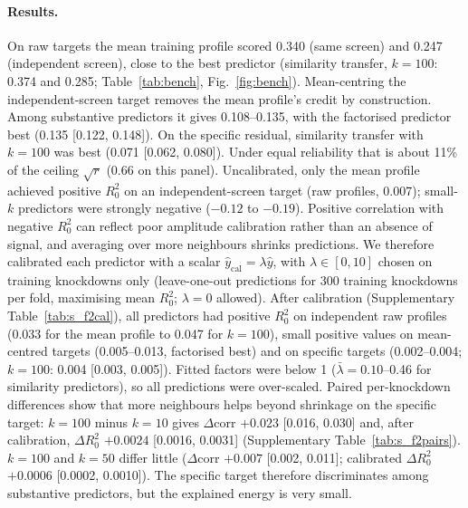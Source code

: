 \documentclass[10pt]{article}
\begin{document}
\paragraph{Results.} On raw targets the mean training profile scored 0.340 (same screen) and 0.247 (independent screen), close to the best predictor (similarity transfer, $k=100$: 0.374 and 0.285; Table~\ref{tab:bench}, Fig.~\ref{fig:bench}).
Mean-centring the independent-screen target removes the mean profile's credit by construction. Among substantive predictors it gives 0.108--0.135, with the factorised predictor best (0.135 [0.122, 0.148]).
On the specific residual, similarity transfer with $k=100$ was best (0.071 [0.062, 0.080]). Under equal reliability that is about 11\% of the ceiling $\sqrt{r}$ (0.66 on this panel).
Uncalibrated, only the mean profile achieved positive $R^2_0$ on an independent-screen target (raw profiles, 0.007); small-$k$ predictors were strongly negative ($-0.12$ to $-0.19$).
Positive correlation with negative $R^2_0$ can reflect poor amplitude calibration rather than an absence of signal, and averaging over more neighbours shrinks predictions. We therefore calibrated each predictor with a scalar $\hat y_\text{cal}=\lambda\hat y$, with $\lambda\in[0,10]$ chosen on training knockdowns only (leave-one-out predictions for 300 training knockdowns per fold, maximising mean $R^2_0$; $\lambda=0$ allowed).
After calibration (Supplementary Table~\ref{tab:s_f2cal}), all predictors had positive $R^2_0$ on independent raw profiles (0.033 for the mean profile to 0.047 for $k=100$), small positive values on mean-centred targets (0.005--0.013, factorised best) and on specific targets (0.002--0.004; $k=100$: 0.004 [0.003, 0.005]). Fitted factors were below 1 ($\bar\lambda=0.10$--0.46 for similarity predictors), so all predictions were over-scaled.
Paired per-knockdown differences show that more neighbours helps beyond shrinkage on the specific target: $k=100$ minus $k=10$ gives $\Delta$corr $+0.023$ [0.016, 0.030] and, after calibration, $\Delta R^2_0$ $+0.0024$ [0.0016, 0.0031] (Supplementary Table~\ref{tab:s_f2pairs}). $k=100$ and $k=50$ differ little ($\Delta$corr $+0.007$ [0.002, 0.011]; calibrated $\Delta R^2_0$ $+0.0006$ [0.0002, 0.0010]).
The specific target therefore discriminates among substantive predictors, but the explained energy is very small.

\begin{table}[t]
\centering\small
\caption{\textbf{Held-out knockdown prediction} (1{,}396 held-out knockdowns, 5 folds). Correlation with bootstrap 95\% CI; $R^2_0$ = R-squared relative to predicting zero (magnitude-sensitive). n/a: correlation undefined for a constant prediction. Bottom rows: cross-screen agreement of the targets on the same panel and the implied ceiling under equal reliability.}
\label{tab:bench}
\resizebox{\textwidth}{!}{}
\end{table}
\end{document}
